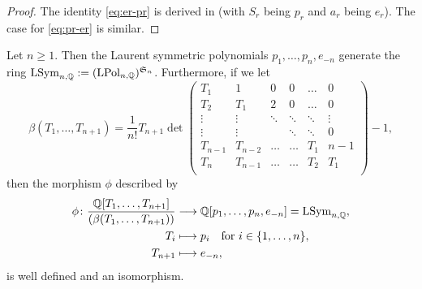 \documentclass[11pt]{amsart}
\begin{document}
\begin{proof}
    The identity \cref{eq:er-pr} is derived in \cite[(6.2; 6), (6.2; 7)]{Lit06} (with $S_r$ being $p_r$ and $a_r$ being $e_r$). The case for \cref{eq:pr-er} is similar.
\end{proof}

\begin{prop}\label{prop:p_ngen}
    Let \(n \geq 1\).  Then the Laurent symmetric polynomials \(p_1,\dots,p_n,e_{-n}\) generate the ring \(\mathrm{LSym}_{n,\mathbb{Q}}:=(\mathrm{LPol}_{n, \mathbb{Q}})^{\mathfrak{S}_n}\). Furthermore, if we let 
    \[
    \beta(T_1,\dots,T_{n +1}) = \frac{1}{n!}T_{n+ 1}\det 
    \begin{pmatrix}
        T_1 & 1 & 0 & 0 & \dots & 0\\
        T_2 & T_1 & 2  & 0 & \dots & 0\\
        \vdots & \vdots & \ddots & \ddots & \ddots & \vdots\\
        \vdots & \vdots &  & \ddots & \ddots & 0 \\
        T_{n-1} & T_{n -2} & \dots & \dots & T_1 & n-1 \\
        T_n & T_{n - 1} & \dots & \dots & T_2 & T_1 \\
    \end{pmatrix} - 1,
    \]
    then the morphism $\phi$ described by
    \begin{align*}
     \phi \colon \frac{\mathbb{Q}[T_1,\dots,T_{n + 1}]}{(\beta (T_1,\dots,T_{n+ 1}))}&\longrightarrow \mathbb{Q}[p_1,\dots, p_n, e_{-n}] = \mathrm{LSym}_{n,\mathbb{Q}}, \\
        T_i &\longmapsto p_i \quad \text{for }i \in \{ 1,\dots,n\}, \\
        T_{n+1} &\longmapsto e_{-n},
    \end{align*}
    is well defined and an isomorphism.
\end{prop}
\end{document}
